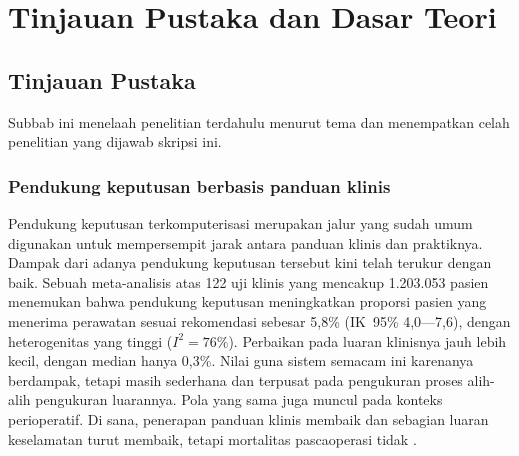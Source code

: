 \chapter{Tinjauan Pustaka dan Dasar Teori}


\section{Tinjauan Pustaka}

Subbab ini menelaah penelitian terdahulu menurut tema dan menempatkan celah penelitian yang
dijawab skripsi ini.

\subsection{Pendukung keputusan berbasis panduan klinis}
Pendukung keputusan terkomputerisasi merupakan jalur yang sudah umum digunakan untuk mempersempit jarak antara panduan klinis dan praktiknya. Dampak dari adanya pendukung keputusan tersebut kini telah terukur dengan baik. Sebuah meta-analisis \cite{kwan2020} atas 122 uji klinis yang mencakup 1.203.053 pasien
menemukan bahwa pendukung keputusan meningkatkan proporsi pasien yang menerima perawatan
sesuai rekomendasi sebesar 5,8\% (IK~95\% 4,0---7,6), dengan heterogenitas yang tinggi ($I^2
= 76\%$). Perbaikan pada luaran klinisnya jauh lebih kecil, dengan median hanya 0,3\%. Nilai guna sistem semacam ini karenanya berdampak, tetapi masih sederhana dan terpusat pada
pengukuran proses alih-alih pengukuran luarannya. Pola yang sama juga muncul pada konteks
perioperatif. Di sana, penerapan panduan klinis membaik dan sebagian luaran keselamatan
turut membaik, tetapi mortalitas pascaoperasi tidak \cite{cai2024}.

